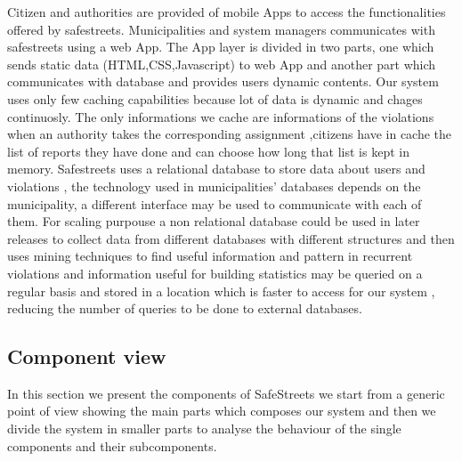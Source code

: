Citizen and authorities are provided of mobile Apps to access the functionalities offered by safestreets. Municipalities and system managers communicates with safestreets using a web App.
The App layer is divided in two parts, one which sends static data (HTML,CSS,Javascript) to web App and another part which communicates with database and provides users dynamic contents.
Our system uses only few caching capabilities because lot of data is dynamic and chages continuosly. The only informations we cache are informations of the violations when an authority takes the corresponding assignment ,citizens have in cache the list of reports they have done and can choose how long that list is kept in memory.
Safestreets uses a relational database to store data about users and violations , the technology used in municipalities' databases depends on the municipality, a different interface may be used to communicate with each of them. For scaling purpouse a non relational database could be used in later releases to collect data from different databases with different structures and then uses mining techniques to find useful information and pattern in recurrent violations and information useful for building statistics may be queried on a regular basis and stored in a location which is faster to access for our system , reducing the number of queries to be done to external databases. 


\subsection{Component view}
In this section we present the components of SafeStreets we start from a generic point of view showing the main parts which composes our system and then we divide the system in smaller parts to analyse the behaviour of the single components and their subcomponents.

